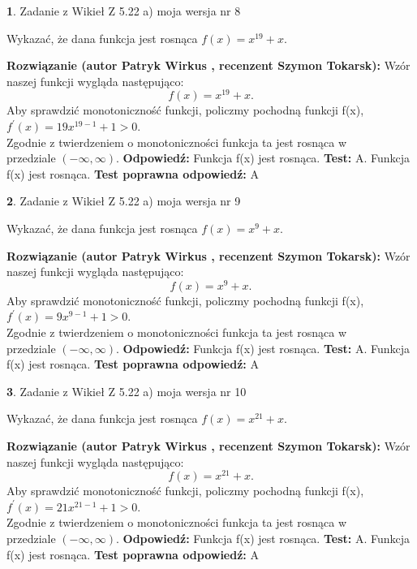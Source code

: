 \documentclass[12pt, a4paper]{article}
\theoremstyle{definition} %
\newtheorem{zad}{}
\newcommand{\zadStart}[1]{\begin{zad}#1\newline}
\newcommand{\zadStop}{\end{zad}}
\newcommand{\rozwStart}[2]{\noindent \textbf{Rozwiązanie (autor #1 , recenzent #2): }\newline}
\newcommand{\rozwStop}{\newline}
\newcommand{\odpStart}{\noindent \textbf{Odpowiedź:}\newline}
\newcommand{\odpStop}{\newline}
\newcommand{\testStart}{\noindent \textbf{Test:}\newline}
\newcommand{\testStop}{\newline}
\newcommand{\kluczStart}{\noindent \textbf{Test poprawna odpowiedź:}\newline}
\newcommand{\kluczStop}{\newline}
\begin{document}
\zadStart{Zadanie z Wikieł Z 5.22 a) moja wersja nr 8}

Wykazać, że dana funkcja jest rosnąca $f(x) = x^{19}+x$.
\zadStop
\rozwStart{Patryk Wirkus}{Szymon Tokarsk}
Wzór naszej funkcji wygląda następująco:
$$f(x) = x^{19}+x.$$
Aby sprawdzić monotoniczność funkcji, policzmy pochodną funkcji f(x),\\ $f^{'}(x) = 19x^{19-1}+1 > 0$.\\
Zgodnie z twierdzeniem o monotoniczności funkcja ta jest rosnąca w\\ przedziale $(-\infty,\infty)$.
\rozwStop
\odpStart
Funkcja f(x) jest rosnąca.
\odpStop
\testStart
A. Funkcja f(x) jest rosnąca.
\testStop
\kluczStart
A
\kluczStop



\zadStart{Zadanie z Wikieł Z 5.22 a) moja wersja nr 9}

Wykazać, że dana funkcja jest rosnąca $f(x) = x^{9}+x$.
\zadStop
\rozwStart{Patryk Wirkus}{Szymon Tokarsk}
Wzór naszej funkcji wygląda następująco:
$$f(x) = x^{9}+x.$$
Aby sprawdzić monotoniczność funkcji, policzmy pochodną funkcji f(x),\\ $f^{'}(x) = 9x^{9-1}+1 > 0$.\\
Zgodnie z twierdzeniem o monotoniczności funkcja ta jest rosnąca w\\ przedziale $(-\infty,\infty)$.
\rozwStop
\odpStart
Funkcja f(x) jest rosnąca.
\odpStop
\testStart
A. Funkcja f(x) jest rosnąca.
\testStop
\kluczStart
A
\kluczStop



\zadStart{Zadanie z Wikieł Z 5.22 a) moja wersja nr 10}

Wykazać, że dana funkcja jest rosnąca $f(x) = x^{21}+x$.
\zadStop
\rozwStart{Patryk Wirkus}{Szymon Tokarsk}
Wzór naszej funkcji wygląda następująco:
$$f(x) = x^{21}+x.$$
Aby sprawdzić monotoniczność funkcji, policzmy pochodną funkcji f(x),\\ $f^{'}(x) = 21x^{21-1}+1 > 0$.\\
Zgodnie z twierdzeniem o monotoniczności funkcja ta jest rosnąca w\\ przedziale $(-\infty,\infty)$.
\rozwStop
\odpStart
Funkcja f(x) jest rosnąca.
\odpStop
\testStart
A. Funkcja f(x) jest rosnąca.
\testStop
\kluczStart
A
\kluczStop
\end{document}
